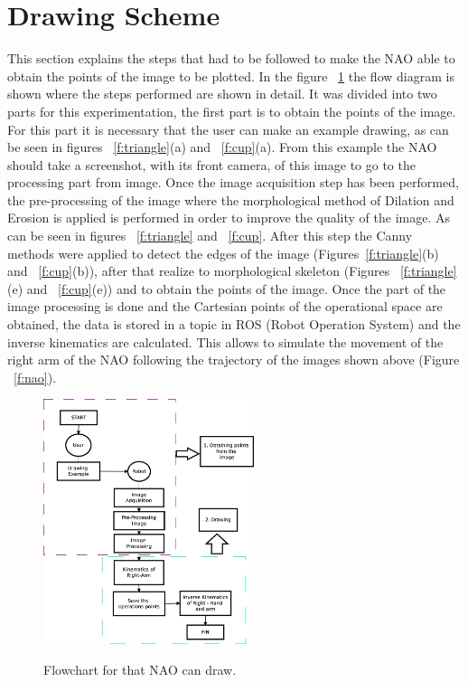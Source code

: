 \documentclass[conference]{IEEEtran}
\begin{document}
\section{Drawing Scheme}
This section explains the steps that had to be followed to make the NAO able to obtain the points of the image to be plotted. In the figure ~\ref{f: flowchart} the flow diagram is shown where the steps performed are shown in detail.
It was divided into two parts for this experimentation, the first part is to obtain the points of the image. For this part it is necessary that the user can make an example drawing, as can be seen in figures ~\ref{f:triangle}(a) and ~\ref{f:cup}(a). From this example the NAO should take a screenshot, with its front camera, of this image to go to the processing part from image. Once the image acquisition step has been performed, the pre-processing of the image where the morphological method of Dilation and Erosion is applied is performed in order to improve the quality of the image. As can be seen in figures ~\ref{f:triangle} and ~\ref{f:cup}. After this step the Canny methods were applied to detect the edges of the image (Figures~\ref{f:triangle}(b) and ~\ref{f:cup}(b)), after that realize to morphological skeleton (Figures ~\ref{f:triangle}(e) and ~\ref{f:cup}(e)) and to obtain the points of the image. Once the part of the image processing is done and the Cartesian points of the operational space are obtained, the data is stored in a topic in ROS (Robot Operation System) and the inverse kinematics are calculated. This allows to simulate the movement of the right arm of the NAO following the trajectory of the images shown above (Figure ~\ref{f:nao}).

\begin{figure}
\centering
\captionsetup{font=footnotesize}
\includegraphics[width=0.55\textwidth]{flowchart.eps}\\
\caption{Flowchart for that NAO can draw.}
\label{f: flowchart}
\end{figure}
\end{document}
